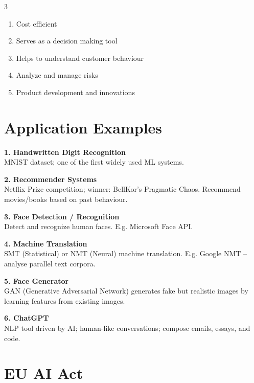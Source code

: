 \documentclass[a4paper,7pt]{extarticle}
\begin{document}
\begin{multicols}{3}
\begin{infobox}[5 Benefits]
\begin{enumerate}
  \item Cost efficient
  \item Serves as a decision making tool
  \item Helps to understand customer behaviour
  \item Analyze and manage risks
  \item Product development and innovations
\end{enumerate}
\end{infobox}

\section{Application Examples}

\begin{defbox}
\textbf{1. Handwritten Digit Recognition}\\
MNIST dataset; one of the first widely used ML systems.

\textbf{2. Recommender Systems}\\
Netflix Prize competition; winner: BellKor's Pragmatic Chaos. Recommend movies/books based on past behaviour.

\textbf{3. Face Detection / Recognition}\\
Detect and recognize human faces. E.g. Microsoft Face API.

\textbf{4. Machine Translation}\\
SMT (Statistical) or NMT (Neural) machine translation. E.g. Google NMT -- analyse parallel text corpora.

\textbf{5. Face Generator}\\
GAN (Generative Adversarial Network) generates fake but realistic images by learning features from existing images.

\textbf{6. ChatGPT}\\
NLP tool driven by AI; human-like conversations; compose emails, essays, and code.
\end{defbox}

\section{EU AI Act}


\end{multicols}
\end{document}
